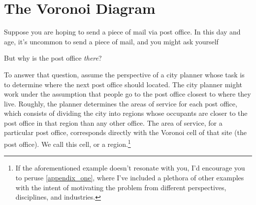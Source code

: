 \documentclass[12pt,twoside]{reedthesis}
\begin{document}
    


  \chapter*{The Voronoi Diagram}
    \setcounter{chapter}{2}
    \setcounter{section}{0}
    Suppose you are hoping to send a piece of mail via post office. In this day and age, it's uncommon to send a piece of mail, and you might ask yourself  \par
    But why is the post office \emph{there}? \par
    To answer that question, assume the perspective of a city planner whose task is to determine where the next post office should located. The city planner might work under the assumption that people go to the post office closest to where they live. Roughly, the planner determines the areas of service for each post office, which consists of dividing the city into regions whose occupants are closer to the post office in that region than any other office. The area of service, for a particular post office, corresponds directly with the Voronoi cell of that site (the post office). We call this cell, or a region.\footnote{If the aforementioned example doesn't resonate with you, I'd encourage you to peruse \cref{appendix_one}, where I've included a plethora of other examples with the intent of motivating the problem from different perspectives, disciplines, and industries.}\par
\end{document}
